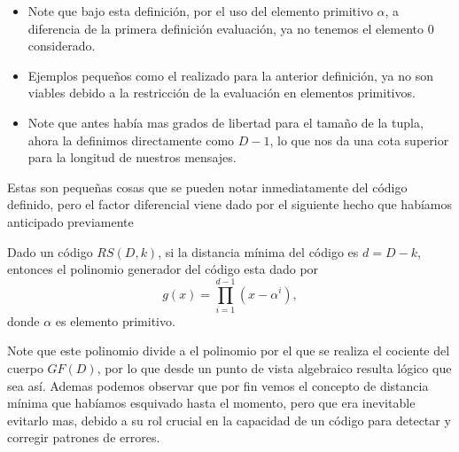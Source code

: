 \begin{itemize}
    \item Note que bajo esta definición, por el uso del elemento primitivo $\alpha$, a diferencia de la primera definición evaluación, ya no tenemos el elemento $0$ considerado.
    \item Ejemplos pequeños como el realizado para la anterior definición, ya no son viables debido a la restricción de la evaluación en elementos primitivos.
    \item Note que antes había mas grados de libertad para el tamaño de la tupla, ahora la definimos directamente como $D-1$, lo que nos da una cota superior para la longitud de nuestros mensajes.
\end{itemize}
Estas son pequeñas cosas que se pueden notar inmediatamente del código definido, pero el factor diferencial viene dado por el siguiente hecho que habíamos anticipado previamente
\begin{theorem}
    Dado un código $RS(D,k)$, si la distancia mínima del código es $d=D-k$, entonces el polinomio generador del código esta dado por
    $$g(x)=\prod_{i=1}^{d-1}(x-\alpha^i),$$
    donde $\alpha$ es elemento primitivo.
\end{theorem}

Note que este polinomio divide a el polinomio por el que se realiza el cociente del cuerpo $GF(D)$, por lo que desde un punto de vista algebraico resulta lógico que sea así. Ademas podemos observar que por fin vemos el concepto de distancia mínima que habíamos esquivado hasta el momento, pero que era inevitable evitarlo mas, debido a su rol crucial en la capacidad de un código para detectar y corregir patrones de errores.







